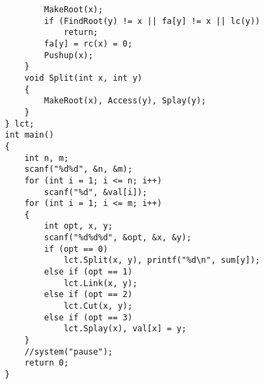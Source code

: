 \begin{lstlisting}
        MakeRoot(x);
        if (FindRoot(y) != x || fa[y] != x || lc(y))
            return;
        fa[y] = rc(x) = 0;
        Pushup(x);
    }
    void Split(int x, int y)
    {
        MakeRoot(x), Access(y), Splay(y);
    }
} lct;
int main()
{
    int n, m;
    scanf("%d%d", &n, &m);
    for (int i = 1; i <= n; i++)
        scanf("%d", &val[i]);
    for (int i = 1; i <= m; i++)
    {
        int opt, x, y;
        scanf("%d%d%d", &opt, &x, &y);
        if (opt == 0)
            lct.Split(x, y), printf("%d\n", sum[y]);
        else if (opt == 1)
            lct.Link(x, y);
        else if (opt == 2)
            lct.Cut(x, y);
        else if (opt == 3)
            lct.Splay(x), val[x] = y;
    }
    //system("pause");
    return 0;
}
\end{lstlisting}